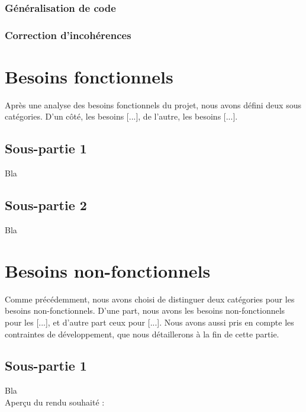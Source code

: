 \subsubsection{Généralisation de code}
\subsubsection{Correction d'incohérences}



\iffalse
\section{Besoins fonctionnels}

Après une analyse des besoins fonctionnels du projet, nous avons défini deux sous catégories. D'un côté, les besoins [...], de l'autre, les besoins [...].

\subsection{Sous-partie 1}

Bla

\subsection{Sous-partie 2}

Bla

\newpage

\section{Besoins non-fonctionnels}

Comme précédemment, nous avons choisi de distinguer deux catégories pour les besoins non-fonctionnels. D'une part, nous avons les besoins non-fonctionnels pour les [...], et d'autre part ceux pour [...]. Nous avons aussi pris en compte les contraintes de développement, que nous détaillerons à la fin de cette partie.

\subsection{Sous-partie 1}

Bla\\

Aperçu du rendu souhaité :

